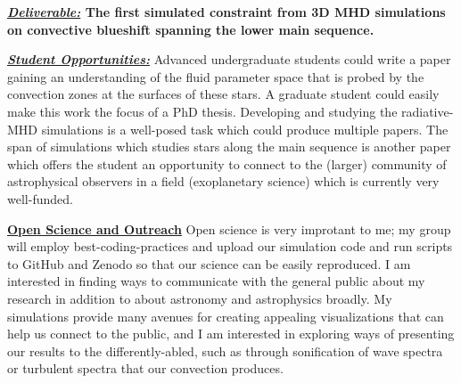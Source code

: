 \documentclass[12pt]{article}
\newcommand{\sct}[1]{\vspace{0.3cm}\hspace{-\parindent}\textbf{\underline{#1}}\hspace{0.3cm}}
\begin{document}
\textbf{\underline{\emph{Deliverable:}} The first simulated constraint from 3D MHD simulations on convective blueshift spanning the lower main sequence.}

\textbf{\underline{\emph{Student Opportunities:}}} Advanced undergraduate students could write a paper gaining an understanding of the fluid parameter space that is probed by the convection zones at the surfaces of these stars.
A graduate student could easily make this work the focus of a PhD thesis.
Developing and studying the radiative-MHD simulations is a well-posed task which could produce multiple papers.
The span of simulations which studies stars along the main sequence is another paper which offers the student an opportunity to connect to the (larger) community of astrophysical observers in a field (exoplanetary science) which is currently very well-funded.


\sct{Open Science and Outreach}
Open science is very improtant to me; my group will employ best-coding-practices and upload our simulation code and run scripts to GitHub and Zenodo so that our science can be easily reproduced.
I am interested in finding ways to communicate with the general public about my research in addition to about astronomy and astrophysics broadly.
My simulations provide many avenues for creating appealing visualizations that can help us connect to the public, and I am interested in exploring ways of presenting our results to the differently-abled, such as through sonification of wave spectra or turbulent spectra that our convection produces.

{\scriptsize

}
\end{document}

